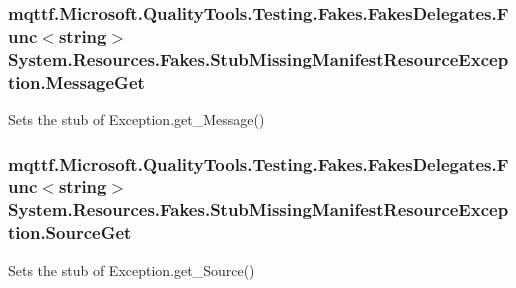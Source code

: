 \hypertarget{class_system_1_1_resources_1_1_fakes_1_1_stub_missing_manifest_resource_exception_ae90a3f159fbfb86c42969a4040e85495}{
\subsubsection[{Message\-Get}]{\setlength{\rightskip}{0pt plus 5cm}mqttf.\-Microsoft.\-Quality\-Tools.\-Testing.\-Fakes.\-Fakes\-Delegates.\-Func$<$string$>$ System.\-Resources.\-Fakes.\-Stub\-Missing\-Manifest\-Resource\-Exception.\-Message\-Get}}\label{class_system_1_1_resources_1_1_fakes_1_1_stub_missing_manifest_resource_exception_ae90a3f159fbfb86c42969a4040e85495}


Sets the stub of Exception.\-get\-\_\-\-Message()

\hypertarget{class_system_1_1_resources_1_1_fakes_1_1_stub_missing_manifest_resource_exception_ae2ff481643a1f12984a3a3276ff7366e}{
\subsubsection[{Source\-Get}]{\setlength{\rightskip}{0pt plus 5cm}mqttf.\-Microsoft.\-Quality\-Tools.\-Testing.\-Fakes.\-Fakes\-Delegates.\-Func$<$string$>$ System.\-Resources.\-Fakes.\-Stub\-Missing\-Manifest\-Resource\-Exception.\-Source\-Get}}\label{class_system_1_1_resources_1_1_fakes_1_1_stub_missing_manifest_resource_exception_ae2ff481643a1f12984a3a3276ff7366e}


Sets the stub of Exception.\-get\-\_\-\-Source()

